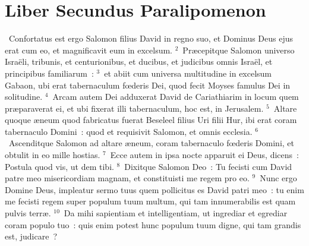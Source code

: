 \clearpage
{\centering \section*{Liber Secundus Paralipomenon}}\thispagestyle{empty}

~Confortatus est ergo Salomon filius David in regno suo, et Dominus Deus ejus erat cum eo, et magnificavit eum in excelsum.
${}^{2}$~Pr\ae cepitque Salomon universo Isra\"eli, tribunis, et centurionibus, et ducibus, et judicibus omnis Isra\"el, et principibus familiarum~:
${}^{3}$~et abiit cum universa multitudine in excelsum Gabaon, ubi erat tabernaculum fœderis Dei, quod fecit Moyses famulus Dei in solitudine.
${}^{4}$~Arcam autem Dei adduxerat David de Cariathiarim in locum quem pr\ae paraverat ei, et ubi fixerat illi tabernaculum, hoc est, in Jerusalem.
${}^{5}$~Altare quoque \ae neum quod fabricatus fuerat Beseleel filius Uri filii Hur, ibi erat coram tabernaculo Domini~: quod et requisivit Salomon, et omnis ecclesia.
${}^{6}$~Ascenditque Salomon ad altare \ae neum, coram tabernaculo fœderis Domini, et obtulit in eo mille hostias.
${}^{7}$~Ecce autem in ipsa nocte apparuit ei Deus, dicens~: Postula quod vis, ut dem tibi.
${}^{8}$~Dixitque Salomon Deo~: Tu fecisti cum David patre meo misericordiam magnam, et constituisti me regem pro eo.
${}^{9}$~Nunc ergo Domine Deus, impleatur sermo tuus quem pollicitus es David patri meo~: tu enim me fecisti regem super populum tuum multum, qui tam innumerabilis est quam pulvis terr\ae .
${}^{10}$~Da mihi sapientiam et intelligentiam, ut ingrediar et egrediar coram populo tuo~: quis enim potest hunc populum tuum digne, qui tam grandis est, judicare~?


